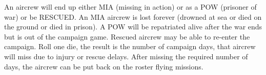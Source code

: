 \begin{advancedrules}
    An aircrew will end up either MIA (missing in action) or as a POW (prisoner of war) or be RESCUED. An MIA aircrew is lost forever (drowned at sea or died on the ground or died in prison). A POW will be repatriated alive after the war ends but is out of the campaign game. Rescued aircrew may be able to re-enter the campaign. Roll one die, the result is the number of campaign days, that aircrew will miss due to injury or rescue delays. After missing the required number of days, the aircrew can be put back on the roster flying missions.

\end{advancedrules}

